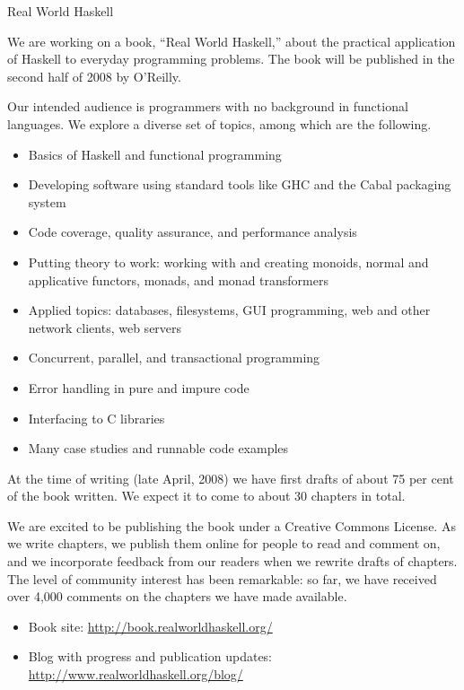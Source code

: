 \documentclass{article}
\begin{document}
\begin{hcarentry}{Real World Haskell}
\makeheader

We are working on a book, ``Real World Haskell,'' about the practical
application of Haskell to everyday programming problems.  The book
will be published in the second half of 2008 by O'Reilly.

Our intended audience is programmers with no background in functional
languages.  We explore a diverse set of topics, among which are the
following.

\begin{itemize}
\item Basics of Haskell and functional programming
\item Developing software using standard tools like GHC and the Cabal
  packaging system
\item Code coverage, quality assurance, and performance analysis
\item Putting theory to work: working with and creating monoids,
  normal and applicative functors, monads, and monad transformers
\item Applied topics: databases, filesystems, GUI programming, web and
  other network clients, web servers
\item Concurrent, parallel, and transactional programming
\item Error handling in pure and impure code
\item Interfacing to C libraries
\item Many case studies and runnable code examples
\end{itemize}

At the time of writing (late April, 2008) we have first drafts of
about 75 per cent of the book written.  We expect it to come to about
30 chapters in total. 

We are excited to be publishing the book under a Creative Commons
License.  As we write chapters, we publish them online for people to
read and comment on, and we incorporate feedback from our readers when
we rewrite drafts of chapters.  The level of community interest has
been remarkable: so far, we have received over 4,000 comments on the
chapters we have made available.

\FurtherReading
\begin{itemize}
\item Book site: \url{http://book.realworldhaskell.org/}
\item Blog with progress and publication updates:
  \url{http://www.realworldhaskell.org/blog/}
\end{itemize}
\end{hcarentry}
\end{document}
